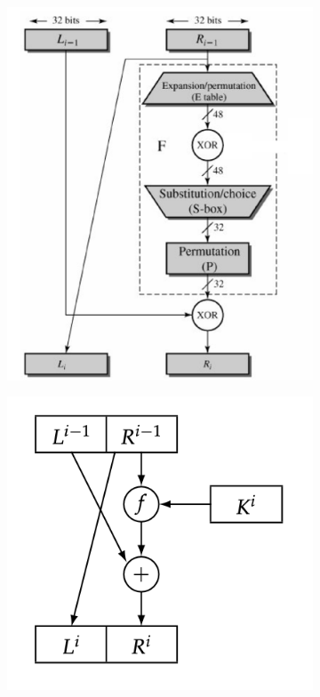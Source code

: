 \documentclass[11pt, oneside]{article}   	%
\begin{document}
\begin{figure}[H]
\begin{subfigure}[h]{0.4\linewidth}
\includegraphics[width=\linewidth]{DES}
\end{subfigure}
\hfill
\begin{subfigure}[h]{0.4\linewidth}
\includegraphics[width=\linewidth]{DES2}
\end{subfigure}%
\end{figure}
\end{document}
